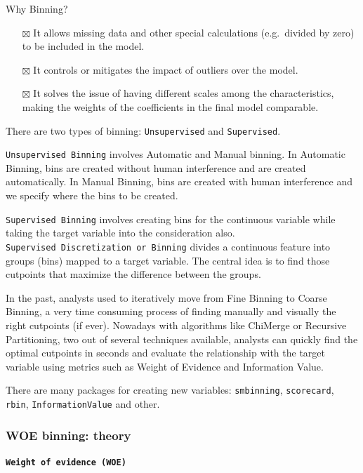 \documentclass[
  letterpaper,
  DIV=11,
  numbers=noendperiod]{scrreprt}
\providecommand{\tightlist}{%
  \setlength{\itemsep}{0pt}\setlength{\parskip}{0pt}}\usepackage{longtable,booktabs,array}
\begin{document}
Why Binning?

\begin{itemize}
\tightlist
\item[$\boxtimes$]
  It allows missing data and other special calculations (e.g.~divided by
  zero) to be included in the model.
\item[$\boxtimes$]
  It controls or mitigates the impact of outliers over the model.
\item[$\boxtimes$]
  It solves the issue of having different scales among the
  characteristics, making the weights of the coefficients in the final
  model comparable.
\end{itemize}

There are two types of binning: \texttt{Unsupervised} and
\texttt{Supervised}.

\texttt{Unsupervised\ Binning} involves Automatic and Manual binning. In
Automatic Binning, bins are created without human interference and are
created automatically. In Manual Binning, bins are created with human
interference and we specify where the bins to be created.

\texttt{Supervised\ Binning} involves creating bins for the continuous
variable while taking the target variable into the consideration also.
\texttt{Supervised\ Discretization\ or\ Binning} divides a continuous
feature into groups (bins) mapped to a target variable. The central idea
is to find those cutpoints that maximize the difference between the
groups.

In the past, analysts used to iteratively move from Fine Binning to
Coarse Binning, a very time consuming process of finding manually and
visually the right cutpoints (if ever). Nowadays with algorithms like
ChiMerge or Recursive Partitioning, two out of several techniques
available, analysts can quickly find the optimal cutpoints in seconds
and evaluate the relationship with the target variable using metrics
such as Weight of Evidence and Information Value.

There are many packages for creating new variables: \texttt{smbinning},
\texttt{scorecard}, \texttt{rbin}, \texttt{InformationValue} and other.

\subsubsection{WOE binning: theory}\label{woe-binning-theory}

\textbf{\texttt{Weight\ of\ evidence\ (WOE)}}
\end{document}
